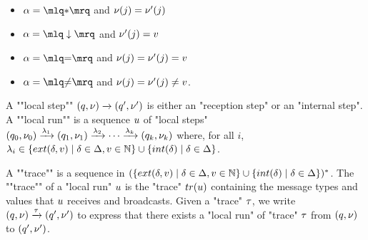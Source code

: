 	\begin{minipage}[t]{6cm}
		\begin{itemize}
			\item $\anact = \quotemarks{\dummyact}$ 
			and $\nu(j) = \nu'(j)$
			\item $\anact = \quotemarks{\enregact}$ and $\nu'(j) = v$
		\end{itemize}
	\end{minipage}
	\begin{minipage}[t]{6cm}
		\begin{itemize}
			\item $\anact = \quotemarks{\eqtestact}$ and $\nu(j) = \nu'(j)= v$
			\item $\anact = \quotemarks{\diseqtestact}$ and $\nu(j) = \nu'(j) \ne v$.
		\end{itemize}
	\end{minipage}
	

	\AP A ""local step"" $(q,\nu) \xrightarrow{} (q',\nu')$ is either an "reception step" or an "internal step". 
	\AP A ""local run"" is a sequence $u$ of "local steps" $(q_0, \nu_0) \xrightarrow{\lambda_1} (q_1, \nu_1) \xrightarrow{\lambda_2} \cdots \xrightarrow{\lambda_k} (q_k, \nu_k)$ where, for all $i$, $\locallabel_i \in \set{\extlabel{\atrans}{\aval} \mid \atrans \in \transitions, \aval \in \nats} \cup \set{\intlabel{\atrans} \mid \atrans \in \transitions}$. 
	
	\AP A ""trace"" is a sequence in $(\set{\extlabel{\atrans}{\aval} \mid \atrans \in \transitions, \aval \in \nats} \cup \set{\intlabel{\atrans} \mid \atrans \in \transitions})^*$. The ""trace"" of a "local run" $u$ is the "trace" $\trace{\localrun}$ containing the message types and values that $u$ receives and broadcasts. Given a "trace" $\tau$, we write $(q,\nu) \xrightarrow{\tau} (q',\nu')$ to express that there exists a "local run" of "trace" $\tau$ from $(q,\nu)$ to $(q',\nu')$. %

	

